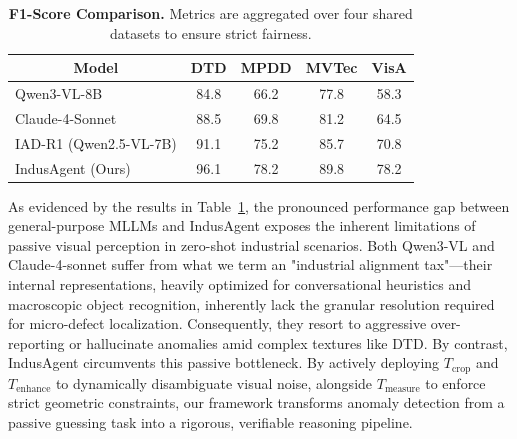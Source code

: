 \documentclass{llmxive}
\begin{document}
{\begin{table}[t]
\vspace{-1.5em} %
  \centering
  \setlength{\tabcolsep}{4.5pt} %
  \footnotesize %
  \begin{tabular}{lcccc}
    \toprule
    \multicolumn{1}{c}{\textbf{Model}} & \textbf{DTD} & \textbf{MPDD} & \textbf{MVTec} & \textbf{VisA} \\
    \midrule
    Qwen3-VL-8B & 84.8 & 66.2 & 77.8 & 58.3 \\
    Claude-4-Sonnet & 88.5 & 69.8 & 81.2 & 64.5 \\
    IAD-R1 (Qwen2.5-VL-7B) & \cellcolor{best}91.1 & \cellcolor{best}75.2 & \cellcolor{best}85.7 &\cellcolor{best} 70.8 \\
    \midrule
    IndusAgent (Ours) & \cellcolor{best2}96.1 & \cellcolor{best2}78.2 & \cellcolor{best2}89.8 & \cellcolor{best2}78.2 \\
    \bottomrule
  \end{tabular}
  \vspace{-1.0em} %

\caption{\textbf{F1-Score Comparison.} Metrics are aggregated over four shared datasets to ensure strict fairness.}
\label{tab:f1_comparison}
\end{table}
As evidenced by the results in Table~\ref{tab:f1_comparison}, the pronounced performance gap between general-purpose MLLMs and IndusAgent exposes the inherent limitations of passive visual perception in zero-shot industrial scenarios. Both Qwen3-VL and Claude-4-sonnet suffer from what we term an "industrial alignment tax"—their internal representations, heavily optimized for conversational heuristics and macroscopic object recognition, inherently lack the granular resolution required for micro-defect localization. Consequently, they resort to aggressive over-reporting or hallucinate anomalies amid complex textures like DTD. By contrast, IndusAgent circumvents this passive bottleneck. By actively deploying $T_{\text{crop}}$ and $T_{\text{enhance}}$ to dynamically disambiguate visual noise, alongside $T_{\text{measure}}$ to enforce strict geometric constraints, our framework transforms anomaly detection from a passive guessing task into a rigorous, verifiable reasoning pipeline.

}
\end{document}
